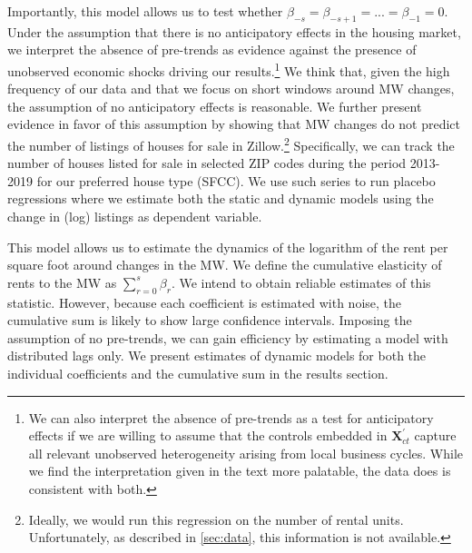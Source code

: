 Importantly, this model allows us to test whether $\beta_{-s} = \beta_{-s+1} = ... = \beta_{-1} 
= 0$. Under the assumption that there is no anticipatory effects in the housing market, we 
interpret the absence of pre-trends as evidence against the presence of unobserved economic 
shocks driving our results.\footnote{We can also interpret the absence of pre-trends as a test 
	for anticipatory effects if we are willing to assume that the controls embedded in 
	$\mathbf{X}^{'}_{ct}$ capture all relevant unobserved heterogeneity arising from local 
	business cycles. While we find the interpretation given in the text more palatable, the 
	data does is consistent with both.}
We think that, given the high frequency of our data and that we focus on short windows around MW 
changes, the assumption of no anticipatory effects is reasonable. We further present evidence in 
favor of this assumption by showing that MW changes do not predict the number of listings of 
houses for sale in Zillow.\footnote{Ideally, we would run this regression on the number of rental 
	units. Unfortunately, as described in \autoref{sec:data}, this information is not available.}
Specifically, we can track the number of houses listed for sale in selected ZIP codes during the 
period 2013-2019 for our preferred house type (SFCC). We use such series to run placebo 
regressions where we estimate both the static and dynamic models using the change in (log) 
listings as dependent variable. %

This model allows us to estimate the dynamics of the logarithm of the rent per square foot around 
changes in the MW. We define the cumulative elasticity of rents to the MW as $\sum_{r=0}^s \beta_r$. 
We intend to obtain reliable estimates of this statistic. However, because each coefficient is 
estimated with noise, the cumulative sum is likely to show large confidence intervals. Imposing 
the assumption of no pre-trends, we can gain efficiency by estimating a model with distributed 
lags only. We present estimates of dynamic models for both the individual coefficients and the 
cumulative sum in the results section.


